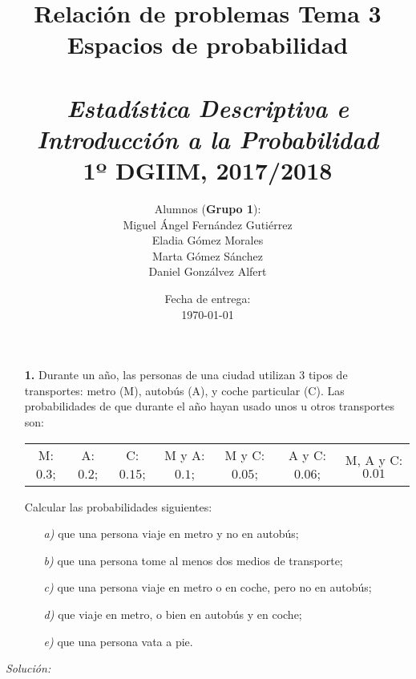 \documentclass[11pt,a4paper]{article}
\title{%
  \textbf{Relación de problemas Tema 3} \\ Espacios de probabilidad \\
  \hspace{1cm}\\
  \large \emph{Estadística Descriptiva e Introducción a la Probabilidad} \\
    1º DGIIM, 2017/2018}
\author{\small{Alumnos (\textbf{Grupo 1}):} \\
Miguel Ángel Fernández Gutiérrez \\
Eladia Gómez Morales \\
Marta Gómez Sánchez \\
Daniel Gonzálvez Alfert}
\date{\small{Fecha de entrega:} \\
\today}
\theoremstyle{definition}
\begin{document}
\maketitle

\hrulefill




\begin{itemize}
	\item[\textbf{1.}] Durante un año, las personas de una ciudad utilizan 3 tipos de transportes: metro (M), autobús (A), y coche particular (C). Las probabilidades de que durante el año hayan usado unos u otros transportes son:
\begin{table}[htb]
\hspace{0.7cm}
\begin{tabular}{c c c c c c c}
	M: $0.3$; & A: $0.2$; & C: $0.15$; & M y A: $0.1$; & M y C: $0.05$; & A y C: $0.06$; & M, A y C: $0.01$	
\end{tabular}
\end{table}

Calcular las probabilidades siguientes:

	\begin{itemize}
		\item[\emph{a)}] que una persona viaje en metro y no en autobús;
		\item[\emph{b)}] que una persona tome al menos dos medios de transporte;
		\item[\emph{c)}] que una persona viaje en metro o en coche, pero no en autobús;
		\item[\emph{d)}] que viaje en metro, o bien en autobús y en coche;
		\item[\emph{e)}] que una persona vata a pie.
	\end{itemize}
\end{itemize}

{\color{grey}\hrulefill}

\emph{Solución:} \\
\end{document}
